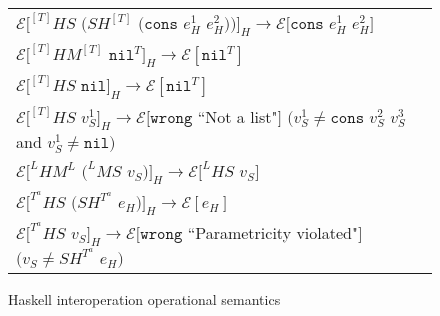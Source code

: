 \begin{figure}[p]
\begin{tabular}{l}
$\mathscr{E}[^{[T]}HS$ $(SH^{[T]}$ $(\mathtt{cons}$ $e_{H}^{1}$ $e_{H}^{2}))]_{H}\rightarrow\mathscr{E}[\mathtt{cons}$ $e_{H}^{1}$ $e_{H}^{2}]$ \\
$\mathscr{E}[^{[T]}HM^{[T]}$ $\mathtt{nil}^{T}]_{H}\rightarrow\mathscr{E}[\mathtt{nil}^{T}]$ \\
$\mathscr{E}[^{[T]}HS$ $\mathtt{nil}]_{H}\rightarrow\mathscr{E}[\mathtt{nil}^{T}]$ \\
$\mathscr{E}[^{[T]}HS$ $v_{S}^{1}]_{H}\rightarrow\mathscr{E}[\mathtt{wrong}$ ``Not a list"$]$ $(v_{S}^{1}\neq\mathtt{cons}$ $v_{S}^{2}$ $v_{S}^{3}$ and $v_{S}^{1}\neq\mathtt{nil})$ \\
$\mathscr{E}[^{L}HM^{L}$ $(^{L}MS$ $v_{S})]_{H}\rightarrow\mathscr{E}[^{L}HS$ $v_{S}]$ \\
$\mathscr{E}[^{T^{a}}HS$ $(SH^{T^{a}}$ $e_{H})]_{H}\rightarrow\mathscr{E}[e_{H}]$ \\
$\mathscr{E}[^{T^{a}}HS$ $v_{S}]_{H}\rightarrow\mathscr{E}[\mathtt{wrong}$ ``Parametricity violated"$]$ $(v_{S}\neq SH^{T^{a}}$ $e_{H})$ \\
\end{tabular}
\caption{Haskell interoperation operational semantics}
\label{hios}
\end{figure}